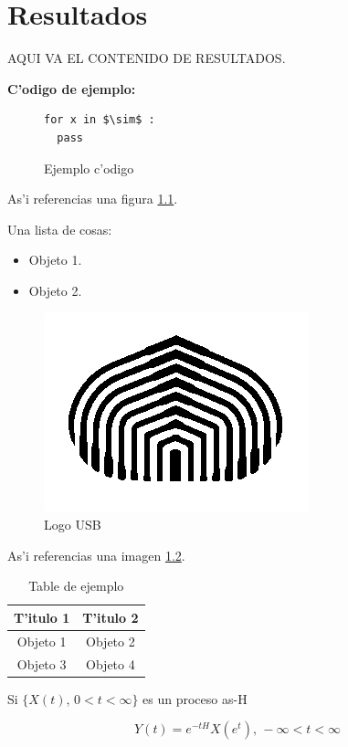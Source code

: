 \chapter{Resultados}\label{chapter:resultados}

AQUI VA EL CONTENIDO DE RESULTADOS.
	
\textbf{C'odigo de ejemplo:}
\begin{figure}[h]
\begin{lstlisting}[mathescape]
for x in $\sim$ :
  pass
\end{lstlisting}
\caption[Ejemplo c'odigo]
{Ejemplo c'odigo}
\label{ejemplo_codigo}
\end{figure}

As'i referencias una figura \ref{ejemplo_codigo}.

Una lista de cosas:
\begin{itemize}
 \item {Objeto 1.} 
 \item {Objeto 2.} 
\end{itemize}

\begin{figure}[h]
	\begin{center}
		\includegraphics[scale=0.4]{imagenes/cebolla.png}
	\end{center}
	\caption{
		\label{fig:cebolla}
		Logo USB
	}
\end{figure}

As'i referencias una imagen \ref{fig:cebolla}.

\begin{table}[h]
\centering
\begin{tabular}{|c|c|}
\hline
T'itulo 1 & T'itulo 2 \\
\hline
Objeto 1 & Objeto 2 \\
\hline
Objeto 3 & Objeto 4 \\
\hline
\end{tabular}
\caption{Table de ejemplo}\label{tab:tabla_ejemplo}
\end{table}

\begin{teorema} \label{teo:formula}
Si $\{X(t) \text{, } 0 < t < \infty \}$ es un proceso as-H
\end{teorema}

\begin{equation} \label{eq:tipoestacionarios1}
Y(t) = e^{-tH}X(e^t) \text{, } - \infty < t < \infty
\end{equation}
